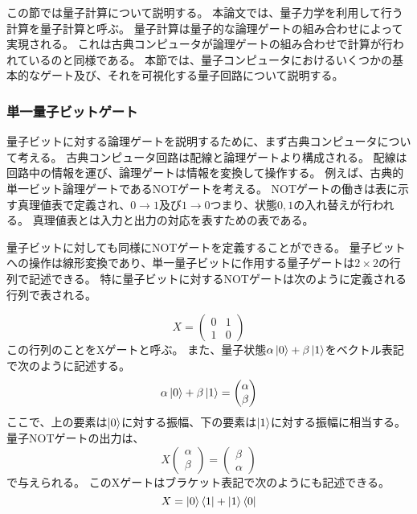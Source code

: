 \begin{comment}
    量子計算についての記述
\end{comment}
この節では量子計算について説明する。
本論文では、量子力学を利用して行う計算を量子計算と呼ぶ。
量子計算は量子的な論理ゲートの組み合わせによって実現される。
これは古典コンピュータが論理ゲートの組み合わせで計算が行われているのと同様である。
本節では、量子コンピュータにおけるいくつかの基本的なゲート及び、それを可視化する量子回路について説明する。

\subsubsection{単一量子ビットゲート}
量子ビットに対する論理ゲートを説明するために、まず古典コンピュータについて考える。
古典コンピュータ回路は配線と論理ゲートより構成される。
配線は回路中の情報を運び、論理ゲートは情報を変換して操作する。
例えば、古典的単一ビット論理ゲートであるNOTゲートを考える。 
NOTゲートの働きは表に示す真理値表で定義され、$0 \rightarrow 1$及び$1 \rightarrow 0$つまり、状態$0, 1$の入れ替えが行われる。
真理値表とは入力と出力の対応を表すための表である。

量子ビットに対しても同様にNOTゲートを定義することができる。
量子ビットへの操作は線形変換であり、単一量子ビットに作用する量子ゲートは$2 \times 2$の行列で記述できる。
特に量子ビットに対するNOTゲートは次のように定義される行列で表される。

\begin{equation}
    X = \begin{pmatrix}
        0 & 1\\
        1 & 0
    \end{pmatrix}
\end{equation}
この行列のことをXゲートと呼ぶ。
また、量子状態$\alpha \ket{0} + \beta \ket{1}$をベクトル表記で次のように記述する。
\begin{equation}
    \alpha \ket{0} + \beta \ket{1} = \begin{pmatrix}
        \alpha \\
        \beta
    \end{pmatrix}
\end{equation}
ここで、上の要素は$\ket{0}$に対する振幅、下の要素は$\ket{1}$に対する振幅に相当する。
量子NOTゲートの出力は、
\begin{equation}
    X \begin{pmatrix}
        \alpha \\
        \beta
    \end{pmatrix}
    = \begin{pmatrix}
        \beta \\
        \alpha
    \end{pmatrix}
\end{equation}
で与えられる。
このXゲートはブラケット表記で次のようにも記述できる。
\begin{equation}
    X = \ket{0}\bra{1} + \ket{1}\bra{0}
\end{equation}

